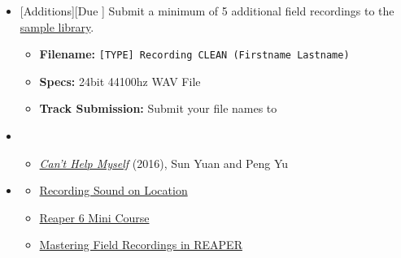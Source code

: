 \begin{itemize}[noitemsep,topsep=0pt,leftmargin=*]
\begin{itemize}
	      \end{itemize}
	\item {}[Additions][Due \dSun] \newline
	      Submit a minimum of 5 additional field recordings to the \href{\samplelibPermURL}{sample library}.
	      \begin{itemize}
		      \item \textbf{Filename:} \texttt{[TYPE] Recording CLEAN (Firstname Lastname)}
		      \item \textbf{Specs:} 24bit 44100hz WAV File
		      \item \textbf{Track Submission:} Submit your file names to \discordS
	      \end{itemize}
	\item {}
	      \begin{itemize}
		      \item \href{https://www.youtube.com/watch?v=ZS4Bpr2BgnE}{\emph{Can’t Help Myself}} (2016), Sun Yuan and Peng Yu
	      \end{itemize}
	\item {}
	      \begin{resenv}
		      \begin{itemize}
			      \item \href{https://www.youtube.com/watch?v=TKBzjSSaKXU}{Recording Sound on Location}
			      \item \href{https://www.youtube.com/playlist?list=PLM0xHqxaiT6-plorG47t3balft4nVki39}{Reaper 6 Mini Course}
			      \item \href{https://www.youtube.com/watch?v=7BfWqRapF5E}{Mastering Field Recordings in REAPER}
		      \end{itemize}
	      \end{resenv}
\end{itemize}